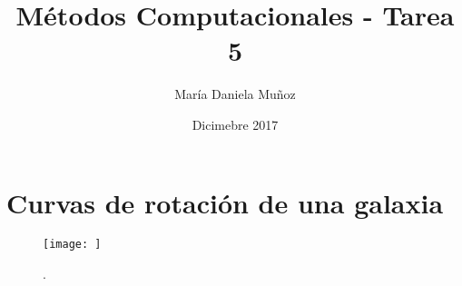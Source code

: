 \documentclass{article}
\title{Métodos Computacionales - Tarea 5}
\author{María Daniela Muñoz}
\date{Dicimebre 2017}
\begin{document}
\maketitle

\section{Curvas de rotación de una galaxia}

\begin{figure}[h]
\begin{center}
\texttt{[image: ]}
\caption{.} \label{cuerda}
\end{center}
\end{figure}
\end{document}
